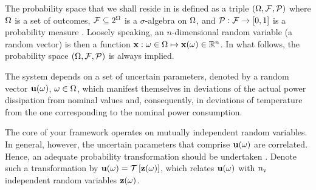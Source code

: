 The probability space that we shall reside in is defined as a triple $(\Omega, \mathcal{F}, \mathcal{P})$ where $\Omega$ is a set of outcomes, $\mathcal{F} \subseteq 2^\Omega$ is a $\sigma$-algebra on $\Omega$, and $\mathcal{P}: \mathcal{F} \to [0, 1]$ is a probability measure \cite{maitre2010}.
Loosely speaking, an $n$-dimensional random variable (a random vector) is then a function $\mathbf{x}: \omega \in \Omega \mapsto \mathbf{x}(\omega) \in \mathbb{R}^n$.
In what follows, the probability space $(\Omega, \mathcal{F}, \mathcal{P})$ is always implied.

The system depends on a set of uncertain parameters, denoted by a random vector $\mathbf{u}(\omega)$, $\omega \in \Omega$, which manifest themselves in deviations of the actual power dissipation from nominal values and, consequently, in deviations of temperature from the one corresponding to the nominal power consumption.

The core of your framework operates on mutually independent random variables.
In general, however, the uncertain parameters that comprise $\mathbf{u}(\omega)$ are correlated.
Hence, an adequate probability transformation should be undertaken \cite{eldred2008}.
Denote such a transformation by $\vU(\o) = \oTransform{\vZ(\o)}$, which relates $\mathbf{u}(\omega)$ with ${n_\text{v}}$ independent random variables $\mathbf{z}(\omega)$.
